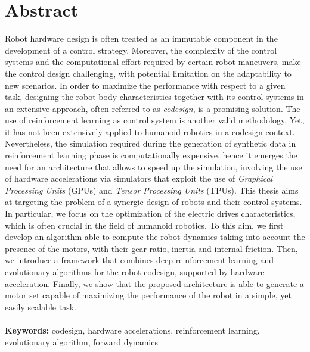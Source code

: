 \documentclass{Configuration_Files/PoliMi3i_thesis}
\begin{document}
\chapter*{Abstract}
Robot hardware design is often treated as an immutable component in the development of a control strategy.
Moreover, the complexity of the control systems and the computational effort required by certain robot maneuvers, make the control design
challenging, with potential limitation on the adaptability to new scenarios. In order to maximize the performance with respect to a given task,
designing the robot body characteristics together with its control systems in an extensive approach, often referred to as \textit{codesign}, is a promising solution. The use of reinforcement learning as control system is another valid methodology. Yet, it has not been extensively applied to humanoid robotics in a codesign context. Nevertheless, the simulation required during the generation of synthetic data in reinforcement learning phase is computationally expensive, hence it emerges the need for an architecture that allows to speed up the simulation, involving the use of hardware accelerations via simulators that exploit the use of \textit{Graphical Processing Units} (GPUs) and \textit{Tensor Processing Units} (TPUs). This thesis aims at targeting the problem of a synergic design of robots and their control systems. In particular, we focus on the optimization of the electric drives characteristics, which is often crucial in the field of humanoid robotics. To this aim, we first develop an algorithm able to compute the robot dynamics taking into account the presence of the motors, with their gear ratio, inertia and internal friction. Then, we introduce a framework that combines deep reinforcement learning and evolutionary algorithms for the robot codesign, supported by hardware acceleration. Finally, we show that the proposed architecture is able to generate a motor set capable of maximizing the performance of the robot in a simple, yet easily scalable task.
\\
\\
\textbf{Keywords:} codesign, hardware accelerations, reinforcement learning, evolutionary algorithm, forward dynamics %

\end{document}
